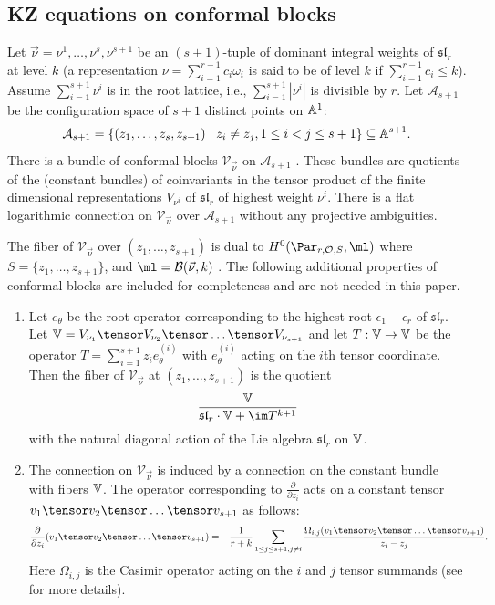\subsection{KZ equations on conformal blocks}\label{chocolate}
 Let $\vec{\nu}=\nu^1,\dots,\nu^s,\nu^{s+1}$ be an $(s+1)$-tuple of dominant integral weights of $\mathfrak{sl}_r$ at level $k$ (a representation $\nu=\sum_{i=1}^{r-1} c_i\omega_i$ is said to be of level $k$ if $\sum_{i=1}^{r-1}c_i\leq k$). Assume $\sum_{i=1}^{s+1} \nu^i$ is in the root lattice, i.e., $\sum_{i=1}^{s+1}|\nu^i|$ is divisible by $r$. Let $\mathcal{A}_{s+1}$ be the configuration space of $s+1$ distinct points on $\Bbb{A}^1$:
$$\mathcal{A}_{s+1}=\{(z_1,\dots,z_s,z_{s+1})\mid z_i\neq z_j, 1\leq i<j \leq s+1\}\subseteq \Bbb{A}^{s+1}.$$
There is a bundle of conformal blocks $\mathcal{V}_{\vec{\nu}}$ on $\mathcal{A}_{s+1}$ \cite{tuy,sorger}. These bundles are quotients of the (constant bundles) of  coinvariants in the tensor product of the finite dimensional  representations $V_{\nu^i}$ of $\mathfrak{sl}_r$ of highest weight $\nu^i$. There is a flat logarithmic connection on $\mathcal{V}_{\vec{\nu}}$ over $\mathcal{A}_{s+1}$ without any projective ambiguities.
\begin{remark}
\notready
The fiber of $\mathcal{V}_{\vec{\nu}}$ over $(z_1,\dots,z_{s+1})$ is dual to $H^0(\Par_{r,\mathcal{O},S},\ml)$ where $S=\{z_1,\dots,z_{s+1}\}$, and $\ml=\mathcal{B}(\vec{\nu},k)$ \cite{pauly}. The following additional properties of conformal blocks are included for completeness and are not needed in this paper.
\begin{enumerate}
\item Let $e_{\theta}$ be the root operator corresponding to the highest root $\epsilon_1-\epsilon_r$ of $\mathfrak{sl}_r$. Let $\Bbb{V}= V_{\nu_1}\tensor V_{\nu_2}\tensor\dots \tensor V_{\nu_{s+1}}$ and let $T:\Bbb{V}\to \Bbb{V}$ be the operator $T=\sum_{i=1}^{s+1} z_i e_{\theta}^{(i)}$ with $e_{\theta}^{(i)}$ acting on the $i$th tensor coordinate.  Then the fiber of $\mathcal{V}_{\vec{\nu}}$
    at $(z_1,\dots,z_{s+1})$ is the quotient
    $$\frac{\Bbb{V}}{\mathfrak{sl}_r\cdot \Bbb{V} +\im T^{k+1}}$$ with the natural diagonal action of the Lie algebra $\mathfrak{sl}_r$  on $\Bbb{V}$.

\item The connection on $\mathcal{V}_{\vec{\nu}}$ is induced by a connection on the constant bundle with fibers $\Bbb{V}$. The  operator corresponding to $\frac{\partial}{\partial z_i}$ acts on a constant tensor $v_1\tensor v_2\tensor\dots\tensor v_{s+1}$ as follows:
    $$\frac{\partial}{\partial z_i}(v_1\tensor v_2\tensor\dots\tensor v_{s+1})=
    -\frac{1}{r+k}\sum_{1\leq j\leq s+1, j\neq i}\frac{ {\Omega_{i,j}}(v_1\tensor v_2\tensor\dots\tensor v_{s+1})}{z_i-z_j}.$$
Here $\Omega_{i,j}$ is the Casimir operator acting on the $i$ and $j$ tensor summands (see \cite[(5.40)]{Ueno} for more details).
\end{enumerate}
\end{remark}
